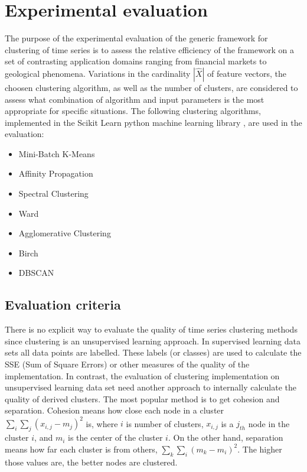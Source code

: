 \documentclass{article}
\begin{document}
\section{Experimental evaluation}
\label{ExperimentalEvaluation}

The purpose of the experimental evaluation of the generic framework for clustering of time series is to assess the relative efficiency of the framework on a set of contrasting application domains ranging from financial markets to geological phenomena. Variations in the cardinality $|\widehat{X}|$ of feature vectors, the choosen clustering algorithm, as well as the number of clusters, are considered to assess what combination of algorithm and input parameters is the most appropriate for specific situations. The following clustering algorithms, implemented in the Scikit Learn python machine learning library \cite{SKL15}, are used in the evaluation:

\begin{itemize}
\item Mini-Batch K-Means
\item Affinity Propagation
\item Spectral Clustering
\item Ward
\item Agglomerative Clustering
\item Birch
\item DBSCAN
\end{itemize}

\subsection{Evaluation criteria}

There is no explicit way to evaluate the quality of time series clustering methods since clustering is an unsupervised learning approach. In supervised learning data sets all data points are labelled. These labels (or classes) are used to calculate the SSE (Sum of Square Errors) or other measures of the quality of the implementation. In contrast, the evaluation of clustering implementation on unsupervised learning data set need another approach to internally calculate the quality of derived clusters. The most popular method is to get cohesion and separation. Cohesion means how close each node in a cluster $\sum_{i} \sum_{j} (x_{i,j}-m_j)^2$ is, where $i$ is number of clusters, $x_{i,j}$ is a $j_{th}$ node in the cluster $i$, and $m_{i}$ is the center of the cluster $i$. On the other hand, separation means how far each cluster is from others, $\sum_{k} \sum_{i} (m_{k}-m_{i})^2$. The higher those values are, the better nodes are clustered.
\end{document}
